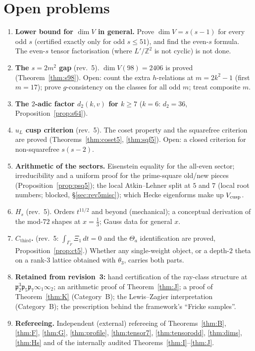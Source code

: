 \documentclass[11pt]{article}
\theoremstyle{definition}
\newcommand{\Z}{\mathbb{Z}}
\newcommand{\fp}{\mathfrak{p}}
\newcommand{\Cthird}{C_{\mathrm{third}}}
\begin{document}
\section{Open problems}\label{sec:open}
\begin{enumerate}[leftmargin=2em]
\item \textbf{Lower bound for $\dim V$ in general.} Prove $\dim V=s(s-1)$ for every odd $s$ (certified exactly only for odd $s\le51$), and find the even-$s$
formula. The even-$s$ tensor factorisation (where $L'/\Z^2$ is not cyclic) is not done.
\item \textbf{The $s=2m^2$ gap} (rev.~5). $\dim V(98)=2406$ is proved (Theorem~\ref{thm:s98}). Open: count the extra $h$-relations at $m=2k^2-1$ (first $m=17$); prove $g$-consistency on the classes for all odd $m$; treat composite $m$.
\item \textbf{The $2$-adic factor $d_2(k,v)$ for $k\ge7$} ($k=6$: $d_2=36$, Proposition~\ref{prop:s64}).
\item \textbf{$u_L$ cusp criterion} (rev.~5). The coset property and the squarefree criterion are proved (Theorems~\ref{thm:coset5}, \ref{thm:sqf5}). Open: a closed criterion for non-squarefree $s(s-2)$.
\item \textbf{Arithmetic of the sectors.} Eisenstein equality for the all-even sector; irreducibility and a uniform proof for the prime-square old/new pieces (Proposition~\ref{prop:psq5}); the local Atkin--Lehner split at $5$ and $7$ (local root numbers; blocked, \S\ref{sec:rev5misc}); which Hecke eigenforms make up $V_{\rm cusp}$.
\item \textbf{$H_s$} (rev.~5). Orders $t^{11/2}$ and beyond (mechanical); a conceptual derivation of the mod-$72$ shapes at $x=\tfrac13$; Gauss data for general $x$.
\item \textbf{$\Cthird$.} (rev.~5: $\int_{\Gamma_F}\Xi_1\,dt=0$ and the $\Theta_a$ identification are proved, Proposition~\ref{prop:ct5}.) Whether any single-weight object, or a depth-$2$ theta on a rank-$3$ lattice obtained with $\theta_3$, carries both parts.
\item \textbf{Retained from revision~3:} hand certification of the ray-class structure at $\fp_2^3\fp_5\fp_7\infty_1\infty_2$; an arithmetic proof of
Theorem~\ref{thm:J}; a proof of Theorem~\ref{thm:K} (Category~B); the Lewis--Zagier interpretation (Category~B); the prescription behind the framework's
``Fricke samples''.
\item \textbf{Refereeing.} Independent (external) refereeing of Theorems~\ref{thm:B}, \ref{thm:F}, \ref{thm:G}, \ref{thm:profile}, \ref{thm:tensor7},
\ref{thm:tensorodd}, \ref{thm:dims}, \ref{thm:Hs} and of the internally audited Theorems~\ref{thm:I}--\ref{thm:J}.
\end{enumerate}
\end{document}
